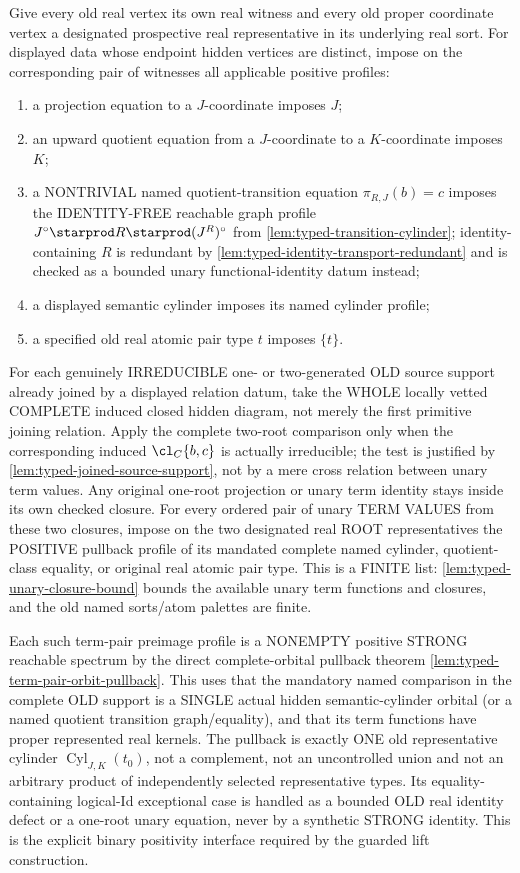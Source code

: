 \begin{construction}
Give every old real vertex its own real witness and every old proper coordinate
vertex a designated prospective real representative in its underlying real
sort.  For displayed data whose endpoint hidden vertices are distinct, impose
on the corresponding pair of witnesses all applicable positive profiles:
\begin{enumerate}[label=(\roman*)]
\item a projection equation to a \(J\)-coordinate imposes \(J\);
\item an upward quotient equation from a \(J\)-coordinate to a
      \(K\)-coordinate imposes \(K\);
\item a NONTRIVIAL named quotient-transition
      equation \(\pi_{R,J}(b)=c\) imposes
      the IDENTITY-FREE reachable graph profile
      \(J^\circ\starprod R\starprod(J^R)^\circ\) from
      \cref{lem:typed-transition-cylinder};
      identity-containing \(R\) is redundant by
      \cref{lem:typed-identity-transport-redundant}
      and is checked as a bounded unary
      functional-identity datum instead;
\item a displayed semantic cylinder imposes its named cylinder profile;
\item a specified old real atomic pair type \(t\) imposes \(\{t\}\).
\end{enumerate}
For each genuinely IRREDUCIBLE
one- or two-generated OLD
source support already joined
by a displayed relation datum,
take the WHOLE locally vetted
COMPLETE induced closed hidden
diagram, not merely the first
primitive joining relation.
Apply the complete two-root
comparison only when the
corresponding induced
\(\cl_C\{b,c\}\) is actually
irreducible; the test is
justified by
\cref{lem:typed-joined-source-support},
not by a mere cross relation
between unary term values.
Any original one-root projection
or unary term identity stays
inside its own checked closure.
For every ordered pair of
unary TERM VALUES from these
two closures, impose on the
two designated real ROOT
representatives the POSITIVE
pullback profile of its
mandated complete named
cylinder, quotient-class
equality, or original
real atomic pair type.
This is a FINITE list:
\cref{lem:typed-unary-closure-bound}
bounds the available unary
term functions and closures,
and the old named sorts/atom
palettes are finite.

Each such term-pair
preimage profile is a
NONEMPTY positive STRONG
reachable spectrum by the
direct complete-orbital
pullback theorem
\cref{lem:typed-term-pair-orbit-pullback}.
This uses that the mandatory
named comparison in the
complete OLD support is a
SINGLE actual hidden
semantic-cylinder orbital
(or a named quotient
transition graph/equality),
and that its term functions
have proper represented
real kernels.
The pullback is exactly
ONE old representative
cylinder
\(\operatorname{Cyl}_{J,K}(t_0)\),
not a complement, not an
uncontrolled union and not
an arbitrary product of
independently selected
representative types.
Its equality-containing
logical-Id exceptional case
is handled as a bounded
OLD real identity defect
or a one-root unary
equation, never by a
synthetic STRONG identity.
This is the explicit
binary positivity interface
required by the guarded
lift construction.


\end{construction}
